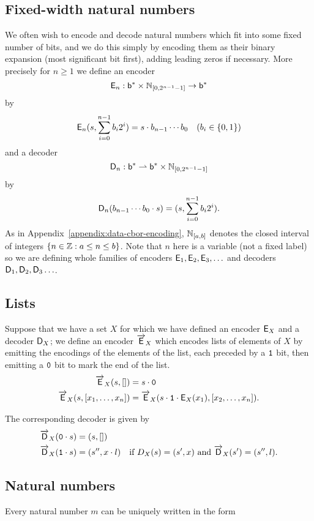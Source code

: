\subsection{Fixed-width natural numbers}
We often wish to encode and decode natural numbers which fit into some fixed
number of bits, and we do this simply by encoding them as their binary expansion
(most significant bit first), adding leading zeros if necessary.  More precisely
for $n \geq 1$ we define an encoder
$$
\mathsf{E}_n : \mathsf{b}^* \times \mathbb{N}_{[0,2^{n-1}-1]} \rightarrow \mathsf{b}^*
$$
by
$$
\mathsf{E}_n(s, \sum^{n-1}_{i=0}b_i2^i) = s \cdot b_{n-1} \cdots b_0 \quad \text{($b_i \in \{0,1\}$)}
$$
and a decoder
$$
\mathsf{D}_n : \mathsf{b}^* \rightharpoonup \mathsf{b}^* \times \mathbb{N}_{[0,2^{n-1}-1]}
$$
by
$$
\mathsf{D}_n(b_{n-1}\cdots{b_0} \cdot s)= (s,\sum^{n-1}_{i=0}b_i2^i).
$$ As in Appendix~\ref{appendix:data-cbor-encoding}, $\mathbb{N}_{[a,b]}$ denotes the
closed interval of integers $\{n \in \mathbb{Z} : a \leq n \leq b\}$.  Note that $n$
here is a variable (not a fixed label) so we are defining whole families of
encoders $\mathsf{E}_1, \mathsf{E}_2, \mathsf{E}_3, \ldots$ and decoders $\mathsf{D}_1, \mathsf{D}_2, \mathsf{D}_3\ldots$.


\subsection{Lists}
\label{sec:flat:lists}
Suppose that we have a set $X$ for which we have defined an encoder $\mathsf{E}_X$ and a
decoder $\mathsf{D}_X$; we define an encoder $\overrightarrow{\mathsf{E}}_X$ which encodes lists of elements
of $X$ by emitting the encodings of the elements of the list, each preceded by a
$\mathtt{1}$ bit, then emitting a $\mathtt{0}$ bit to mark the end of the list.
\begin{align*}
  \overrightarrow{\mathsf{E}}_X(s,[]) &= s \cdot \mathtt{0} \\
  \overrightarrow{\mathsf{E}}_X(s,[x_1, \ldots, x_n]) &= \overrightarrow{\mathsf{E}}_X (s \cdot \mathtt{1} \cdot \mathsf{E}_X(x_1), [x_2, \ldots, x_n]).
\end{align*}

\noindent The corresponding decoder is given by
\begin{align*}
\overrightarrow{\mathsf{D}}_X(\mathtt{0} \cdot s) &= (s,[])\\
\overrightarrow{\mathsf{D}}_X(\mathtt{1} \cdot s) &= (s'', x \cdot l) \quad \text{if $D_X(s) = (s', x)$ and $\overrightarrow{\mathsf{D}}_X(s') = (s'', l).$}
\end{align*}

\subsection{Natural numbers}
Every natural number $m$ can be uniquely written in the form

